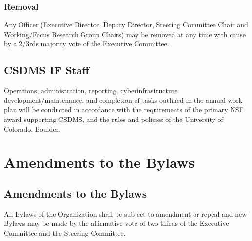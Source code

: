 \documentclass[11pt, oneside]{article}   	%
\def\article#1{
\renewcommand{\thesection}{Article \Roman{section}} 
\section[Article]{#1}
\renewcommand{\thesection}{\Roman{section}} 
}
\begin{document}
\subsubsection{	Removal}

Any Officer (Executive Director, Deputy Director, Steering Committee Chair and Working/Focus Research Group Chairs) may be removed at any time with cause by a 2/3rds majority vote of the Executive Committee.


\subsection{CSDMS IF Staff}

Operations, administration, reporting, cyberinfrastructure development/maintenance, and completion of tasks outlined in the annual work plan will be conducted in accordance with the requirements of the primary NSF award supporting CSDMS, and the rules and policies of the University of Colorado, Boulder.

\article{Amendments to the Bylaws}

\subsection{Amendments to the Bylaws}

All Bylaws of the Organization shall be subject to amendment or repeal and new Bylaws may be made by the affirmative vote of two-thirds of the Executive Committee and the Steering Committee.
\end{document}
